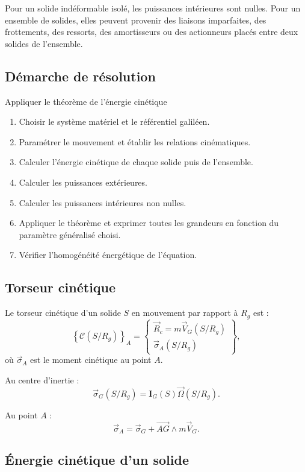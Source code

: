 \TLEnergiePuissance

Pour un solide indéformable isolé, les puissances intérieures sont nulles. Pour un ensemble de solides, elles peuvent provenir des liaisons imparfaites, des frottements, des ressorts, des amortisseurs ou des actionneurs placés entre deux solides de l'ensemble.

\subsection{Démarche de résolution}

\begin{TLMethod}{Appliquer le théorème de l'énergie cinétique}
\begin{enumerate}
  \item Choisir le système matériel et le référentiel galiléen.
  \item Paramétrer le mouvement et établir les relations cinématiques.
  \item Calculer l'énergie cinétique de chaque solide puis de l'ensemble.
  \item Calculer les puissances extérieures.
  \item Calculer les puissances intérieures non nulles.
  \item Appliquer le théorème et exprimer toutes les grandeurs en fonction du paramètre généralisé choisi.
  \item Vérifier l'homogénéité énergétique de l'équation.
\end{enumerate}
\end{TLMethod}

\subsection{Torseur cinétique}

Le torseur cinétique d'un solide $S$ en mouvement par rapport à $R_g$ est :
\[
\left\{\mathcal C(S/R_g)\right\}_A=
\left\{
\begin{array}{c}
\vec R_c=m\vec V_G(S/R_g)\\[1mm]
\vec\sigma_A(S/R_g)
\end{array}
\right\},
\]
où $\vec\sigma_A$ est le moment cinétique au point $A$.

Au centre d'inertie :
\[
\vec\sigma_G(S/R_g)=\mathbf I_G(S)\vec\Omega(S/R_g).
\]

Au point $A$ :
\[
\vec\sigma_A=\vec\sigma_G+\overrightarrow{AG}\wedge m\vec V_G.
\]

\subsection{Énergie cinétique d'un solide}

